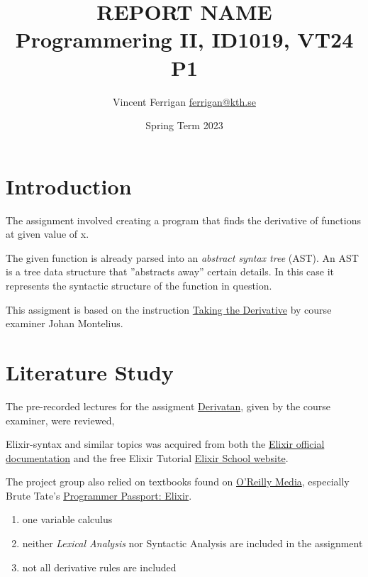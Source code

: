\documentclass[a4paper,11pt]{article}
\begin{document}
\title{
    REPORT NAME
\\\small{Programmering II, ID1019, VT24 P1}
}
\author{Vincent Ferrigan \href{mailto:ferrigan@kth.se}{ferrigan@kth.se}}

\date{Spring Term 2023}

\maketitle

\section*{Introduction}
\label{sec:introduction}
The assignment involved creating a program that finds the derivative of functions at
given value of x.

The given function is already parsed into an \emph{abstract syntax tree} (AST).
An AST is a tree data structure that ''abstracts away'' certain details.
In this case it represents the syntactic structure of the function in question.

This assigment is based on the instruction
\href{https://people.kth.se/~johanmon/courses/id1020/seminars/derivative/derivative.pdfl}{Taking the Derivative}
by course examiner Johan Montelius.

\section{Literature Study}
The pre-recorded lectures for the assigment
\href{https://canvas.kth.se/courses/44911/assignments/275580}{Derivatan},
given by the course examiner, were reviewed,

Elixir-syntax and similar topics was acquired
from both the
\href{https://elixir-lang.org/docs.html}{Elixir official documentation}
and the free Elixir Tutorial
\href{https://elixirschool.com/en}{Elixir School
website}.

The project group also relied on textbooks found on
\href{https://learning.oreilly.com}{O'Reilly Media},
especially Brute Tate's
\href{https://learning.oreilly.com/library/view/programmer-passport-elixir/9781680509649/}{Programmer Passport: Elixir}.

\begin{enumerate}
    \item one variable calculus
    \item neither \emph{Lexical Analysis} nor {Syntactic Analysis} are included in the assignment
    \item not all derivative rules are included
\end{enumerate}
\end{document}
